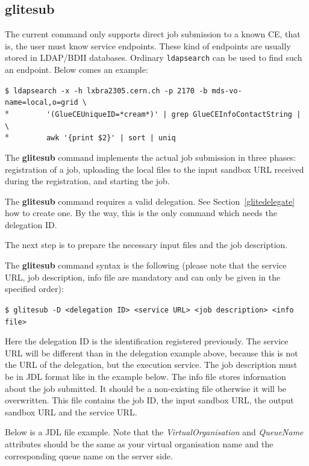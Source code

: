 \documentclass{article}
\begin{document}
\subsection{glitesub}
\label{glitesub}
The current command only supports direct job submission to a known CE, that is, the user must know service endpoints. These kind of endpoints are usually stored in LDAP/BDII databases. Ordinary \texttt{ldapsearch} can be used to find such an endpoint. Below comes an example:

\begin{shaded}
\verb#$ ldapsearch -x -h lxbra2305.cern.ch -p 2170 -b mds-vo-name=local,o=grid \#\\*
\verb#        '(GlueCEUniqueID=*cream*)' | grep GlueCEInfoContactString | \#\\*
\verb#        awk '{print $2}' | sort | uniq#
\end{shaded}
The \textbf{glitesub} command implements the actual job submission in three phases: registration of a job, uploading the local files to the input sandbox URL received during the registration, and starting the job.

The \textbf{glitesub} command requires a valid delegation. See Section~\ref{glitedelegate} how to create one. By the way, this is the only command which needs the delegation ID.

The next step is to prepare the necessary input files and the job description.

The \textbf{glitesub} command syntax is the following (please note that the service URL, job description, info file are mandatory and can only be given in the specified order):
\begin{shaded}\verb#$ glitesub -D <delegation ID> <service URL> <job description> <info file>#\end{shaded}%
Here the delegation ID is the identification registered previously. The service URL will be different than in the delegation example above, because this is not the URL of the delegation, but the execution service. The job description must be in JDL format like in the example below. The info file stores information about the job submitted. It should be a non-existing file otherwise it will be overwritten. This file contains the job ID, the input sandbox URL, the output sandbox URL and the service URL.

Below is a JDL file example. Note that the \textit{VirtualOrganisation} and \textit{QueueName} attributes should be the same as your virtual organisation name and the corresponding queue name on the server side.
\end{document}
